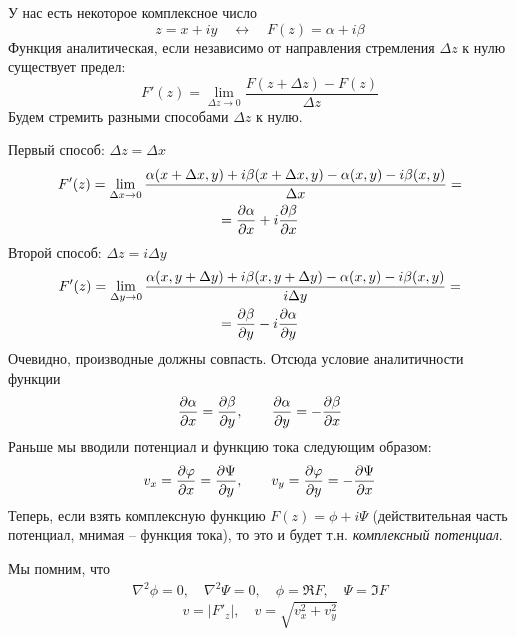 У нас есть некоторое комплексное число
\begin{equation}
	z=x+iy 
	\quad \leftrightarrow \quad
	F(z)=\alpha+i \beta
\end{equation}
Функция аналитическая, если независимо от направления стремления $\Delta z$ к нулю существует предел:
\begin{equation}
	F'(z)=\lim\limits_{\Delta z\to0}\frac{F(z+\Delta z)-F(z)}{\Delta z}
\end{equation}
Будем стремить разными способами $\Delta z$ к нулю.

Первый способ: $\Delta z = \Delta x$
\begin{gather}
	F'(z)=\lim\limits_{\Delta x\to0}\frac{\alpha(x+\Delta x,y)+i\beta(x+\Delta x,y)-\alpha(x,y)-i\beta(x,y)}{\Delta x}=\\=
		\pdv{\alpha}{x}+i\pdv{\beta}{x}
\end{gather}
Второй способ: $\Delta z=i\Delta y$
\begin{gather}
	F'(z)=\lim\limits_{\Delta y\to0}\frac{\alpha(x,y+\Delta y)+i\beta(x,y+\Delta y)-\alpha(x,y)-i\beta(x,y)}{i\Delta y}=\\=
		\pdv{\beta}{y}-i\pdv{\alpha}{y}
\end{gather}
Очевидно, производные должны совпасть. Отсюда условие аналитичности функции
\begin{gather}
	\label{eq2}
	\pdv{\alpha}{x}=\pdv{\beta}{y}, \qquad
	\pdv{\alpha}{y}=-\pdv{\beta}{x}
\end{gather}
Раньше мы вводили потенциал и функцию тока следующим образом:
\begin{gather}
	\label{eq3}
	v_x=\pdv{\varphi}{x}=\pdv{\Psi}{y}, \qquad
	v_y=\pdv{\varphi}{y}=-\pdv{\Psi}{x}
\end{gather}
Теперь, если взять комплексную функцию $F(z)=\phi+i\Psi$ (действительная часть потенциал, мнимая --  функция тока), то это и будет т.н. \textit{комплексный потенциал}.

Мы помним, что
\begin{gather}
	\nabla^2\phi=0,\quad
	\nabla^2\Psi=0,\quad
	\phi=\Re{F},\quad
	\Psi=\Im{F}
\end{gather}
\begin{equation}
	v=|F'_z|, \quad
	v=\sqrt{v_x^2+v_y^2}
\end{equation}


